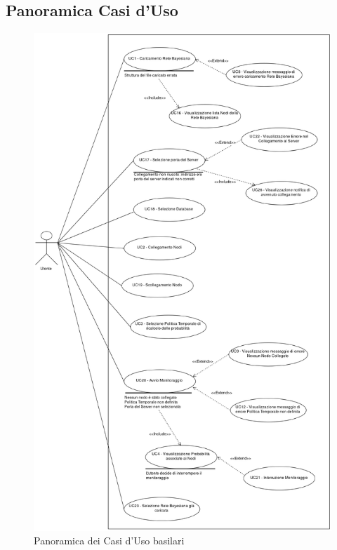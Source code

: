 \subsection{Panoramica Casi d'Uso}\label{PanoramicaUC}
\begin{figure}[H]
	\begin{center}
		\includegraphics[scale=0.18]{./images/VistaUC.png}
		 \caption{Panoramica dei Casi d'Uso basilari}
	\end{center}
\end{figure}

\pagebreak
